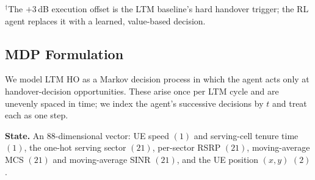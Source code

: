 \documentclass{ieeetmlcn}
\begin{document}
\begin{table}[htbp]
\caption{Calibrated System and Simulation Parameters}
\label{tab:sysparams}
\centering
{}
{\footnotesize $^{\dagger}$The $+3$\,dB execution offset is the LTM baseline's
hard handover trigger; the RL agent replaces it with a learned, value-based
decision.}
\end{table}

\subsection{MDP Formulation}
\label{sec:mdp}
We model LTM HO as a Markov decision process in which the agent acts only at
handover-decision opportunities. These arise once per LTM cycle and are
unevenly spaced in time; we index the agent's successive decisions by $t$ and
treat each as one step.

\textbf{State.} An $88$-dimensional vector: UE speed $(1)$ and serving-cell
tenure time $(1)$, the one-hot serving sector $(21)$, per-sector RSRP $(21)$,
moving-average MCS $(21)$ and moving-average SINR $(21)$, and the UE position
$(x,y)$ $(2)$.
\end{document}
